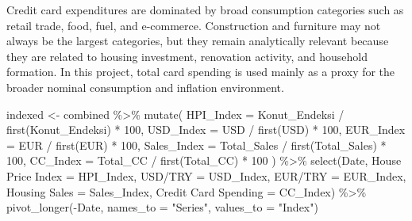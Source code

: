 \documentclass[
  11pt,
  a4paper,
  DIV=11,
  numbers=noendperiod]{scrartcl}
\newenvironment{Shaded}{\begin{snugshade}}{\end{snugshade}}
\newcommand{\AttributeTok}[1]{\textcolor[rgb]{0.40,0.45,0.13}{#1}}
\newcommand{\DecValTok}[1]{\textcolor[rgb]{0.68,0.00,0.00}{#1}}
\newcommand{\FunctionTok}[1]{\textcolor[rgb]{0.28,0.35,0.67}{#1}}
\newcommand{\NormalTok}[1]{\textcolor[rgb]{0.00,0.23,0.31}{#1}}
\newcommand{\OtherTok}[1]{\textcolor[rgb]{0.00,0.23,0.31}{#1}}
\newcommand{\SpecialCharTok}[1]{\textcolor[rgb]{0.37,0.37,0.37}{#1}}
\newcommand{\StringTok}[1]{\textcolor[rgb]{0.13,0.47,0.30}{#1}}
\begin{document}
Credit card expenditures are dominated by broad consumption categories
such as retail trade, food, fuel, and e-commerce. Construction and
furniture may not always be the largest categories, but they remain
analytically relevant because they are related to housing investment,
renovation activity, and household formation. In this project, total
card spending is used mainly as a proxy for the broader nominal
consumption and inflation environment.

\begin{Shaded}
\begin{Highlighting}[]
\NormalTok{indexed }\OtherTok{\textless{}{-}}\NormalTok{ combined }\SpecialCharTok{\%\textgreater{}\%}
  \FunctionTok{mutate}\NormalTok{(}
    \AttributeTok{HPI\_Index =}\NormalTok{ Konut\_Endeksi }\SpecialCharTok{/} \FunctionTok{first}\NormalTok{(Konut\_Endeksi) }\SpecialCharTok{*} \DecValTok{100}\NormalTok{,}
    \AttributeTok{USD\_Index =}\NormalTok{ USD }\SpecialCharTok{/} \FunctionTok{first}\NormalTok{(USD) }\SpecialCharTok{*} \DecValTok{100}\NormalTok{,}
    \AttributeTok{EUR\_Index =}\NormalTok{ EUR }\SpecialCharTok{/} \FunctionTok{first}\NormalTok{(EUR) }\SpecialCharTok{*} \DecValTok{100}\NormalTok{,}
    \AttributeTok{Sales\_Index =}\NormalTok{ Total\_Sales }\SpecialCharTok{/} \FunctionTok{first}\NormalTok{(Total\_Sales) }\SpecialCharTok{*} \DecValTok{100}\NormalTok{,}
    \AttributeTok{CC\_Index =}\NormalTok{ Total\_CC }\SpecialCharTok{/} \FunctionTok{first}\NormalTok{(Total\_CC) }\SpecialCharTok{*} \DecValTok{100}
\NormalTok{  ) }\SpecialCharTok{\%\textgreater{}\%}
  \FunctionTok{select}\NormalTok{(Date, }\StringTok{\textasciigrave{}}\AttributeTok{House Price Index}\StringTok{\textasciigrave{}} \OtherTok{=}\NormalTok{ HPI\_Index, }\StringTok{\textasciigrave{}}\AttributeTok{USD/TRY}\StringTok{\textasciigrave{}} \OtherTok{=}\NormalTok{ USD\_Index,}
         \StringTok{\textasciigrave{}}\AttributeTok{EUR/TRY}\StringTok{\textasciigrave{}} \OtherTok{=}\NormalTok{ EUR\_Index, }\StringTok{\textasciigrave{}}\AttributeTok{Housing Sales}\StringTok{\textasciigrave{}} \OtherTok{=}\NormalTok{ Sales\_Index,}
         \StringTok{\textasciigrave{}}\AttributeTok{Credit Card Spending}\StringTok{\textasciigrave{}} \OtherTok{=}\NormalTok{ CC\_Index) }\SpecialCharTok{\%\textgreater{}\%}
  \FunctionTok{pivot\_longer}\NormalTok{(}\SpecialCharTok{{-}}\NormalTok{Date, }\AttributeTok{names\_to =} \StringTok{"Series"}\NormalTok{, }\AttributeTok{values\_to =} \StringTok{"Index"}\NormalTok{)}


\end{Highlighting}
\end{Shaded}
\end{document}
